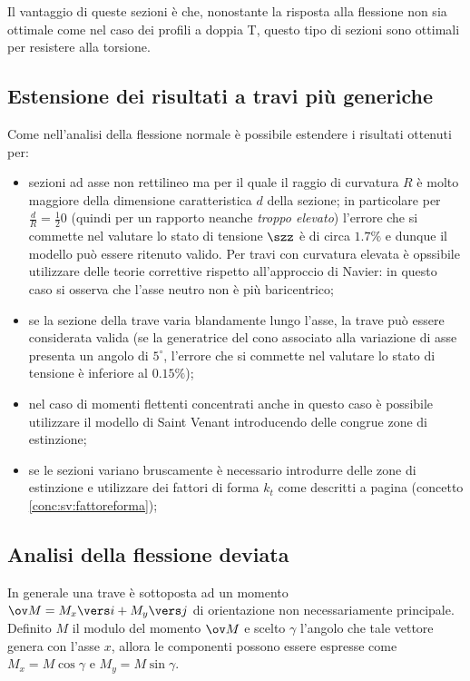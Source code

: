 		Il vantaggio di queste sezioni è che, nonostante la risposta alla flessione non sia ottimale come nel caso dei profili a doppia T, questo tipo di sezioni sono ottimali per resistere alla torsione.
		
	\subsection{Estensione dei risultati a travi più generiche}
		
		Come nell'analisi della flessione normale è possibile estendere i risultati ottenuti per:
		\begin{itemize}
			\item sezioni ad asse non rettilineo ma per il quale il raggio di curvatura $R$ è molto maggiore della dimensione caratteristica $d$ della sezione; in particolare per $\frac dR = \frac 1 20$ (quindi per un rapporto neanche \textit{troppo elevato}) l'errore che si commette nel valutare lo stato di tensione $\szz$ è di circa $1.7\%$ e dunque il modello può essere ritenuto valido. Per travi con curvatura elevata è opssibile utilizzare delle teorie correttive rispetto all'approccio di Navier: in questo caso si osserva che l'asse neutro non è più baricentrico;
			
			\item se la sezione della trave varia blandamente lungo l'asse, la trave può essere considerata valida (se la generatrice del cono associato alla variazione di asse presenta un angolo di $5^\circ$, l'errore che si commette nel valutare lo stato di tensione è inferiore al $0.15\%$);
			
			\item nel caso di momenti flettenti concentrati anche in questo caso è possibile utilizzare il modello di Saint Venant introducendo delle congrue zone di estinzione;
			
			\item se le sezioni variano bruscamente è necessario introdurre delle zone di estinzione e utilizzare dei fattori di forma $k_t$ come descritti a pagina \pageref{conc:sv:fattoreforma} (concetto \ref{conc:sv:fattoreforma});
		\end{itemize}
	
	\subsection{Analisi della flessione deviata}
		In generale una trave è sottoposta ad un momento $\ov M = M_x \vers i + M_y\vers j$ di orientazione non necessariamente principale. Definito $M$ il modulo del momento $\ov M$ e scelto $\gamma$ l'angolo che tale vettore genera con l'asse $x$, allora le componenti possono essere espresse come $M_x = M \cos\gamma$ e $M_y = M\sin\gamma$.
		
